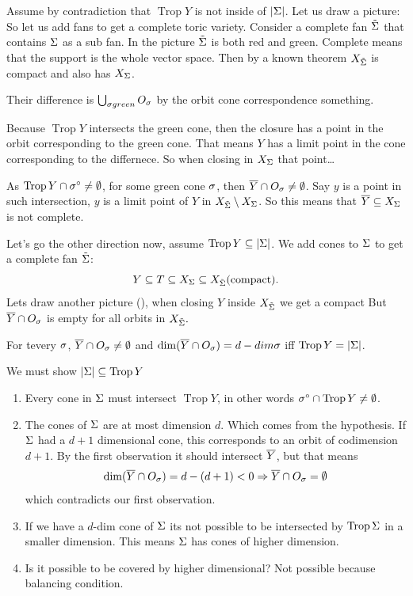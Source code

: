 \documentclass[12pt]{memoir}
\DeclareMathOperator{\Trop}{Trop}
\begin{document}
\begin{ptcbp}
Assume by contradiction that $\Trop Y$ is not inside of $|\Sigma|$. Let us draw a picture: 
So let us add fans to get a complete toric variety. Consider a complete fan $\tilde {\Sigma}$ that contains $\Sigma$ as a sub fan. In the picture $\tilde {\Sigma}$ is both red and green. Complete means that the support is the whole vector space. Then by a known theorem $X_{\tilde{\Sigma}}$ is compact and also has $X_\Sigma$.\par 
Their difference is $\bigcup_{\sigma green}O_\sigma$ by the orbit cone correspondence something.\par 
Because $\Trop Y$ intersects the green cone, then the closure has a point in the orbit corresponding to the green cone. That means $Y$ has a limit point in the cone corresponding to the differnece. So when closing in $X_\Sigma$ that point\dots\par 
As $\Trop Y\cap \sg^\circ\neq\emptyset$, for some green cone $\sigma$, then $\overline Y\cap O_\sigma\neq \emptyset$. Say $y$ is a point in such intersection, $y$ is a limit point of $Y$ in $X_{\tilde{\Sigma}}\setminus X_\Sigma$. So this means that $\overline Y\subseteq X_\Sigma$ is not complete.\par 
Let's go the other direction now, assume $\Trop Y\subseteq |\Sg|$. We add cones to $\Sigma$ to get a complete fan $\tilde {\Sigma}$:
$$Y\subseteq T\subseteq X_\Sigma\subseteq X_{\tilde {\Sigma}} (\text{compact}).$$
Lets draw another picture (), when closing $Y$ inside $X_{\tilde{\Sigma}}$ we get a compact  But $\overline Y\cap O_\sigma$ is empty for all orbits in $X_{\tilde{\Sigma}}.$
\end{ptcbp}
\begin{Th}

\end{Th}

\begin{ptcbp}
For tevery $\sigma$, $\overline Y\cap O_\sigma\neq \emptyset$ and $\dim(\overline Y\cap O_\sigma)=d-dim\sigma$ iff $\Trop Y=|\Sg|$.\par 
We must show $|\Sg|\subseteq\Trop Y$
\begin{enumerate}
    \item Every cone in $\Sigma$ must intersect $\Trop Y$, in other words $\sg^\circ\cap\Trop Y\neq\emptyset$.
    \item The cones of $\Sigma$ are at most dimension $d$. Which comes from the hypothesis. If $\Sigma$ had a $d+1$ dimensional cone, this corresponds to an orbit of codimension $d+1$. By the first observation it should intersect $\overline Y$, but that means 
    $$\dim (\overline Y\cap O_\sigma)=d-(d+1)<0\Rightarrow \overline Y\cap O_\sigma=\emptyset$$
    which contradicts our first observation.
    \item If we have a $d$-dim cone of $\Sigma$ its not possible to be intersected by $\Trop\Sg$ in a smaller dimension. This means $\Sigma$ has cones of higher dimension.
    \item Is it possible to be covered by higher dimensional? Not possible because balancing condition.
\end{enumerate}
\end{ptcbp}
\end{document}
